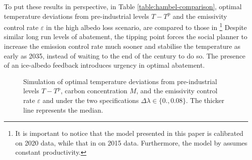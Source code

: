 \documentclass[../../main.tex]{subfiles}
\begin{document}
To put these results in perspective, in Table \ref{table:hambel-comparison}, optimal temperature deviations from pre-industrial levels $T - T^{\mathrm{p}}$ and the emissivity control rate $\varepsilon$ in the high albedo loss scenario, are compared to those in \footnote{It is important to notice that the model presented in this paper is calibrated on 2020 data, while that in  on 2015 data. Furthermore, the model by  assumes constant productivity.} Despite similar long run levels of abatement, the tipping point forces the social planner to increase the emission control rate much sooner and stabilise the temperature as early as 2035, instead of waiting to the end of the century to do so. The presence of an ice-albedo feedback introduces urgency in optimal abatement.


\begin{figure}
    \centering
    \caption{Simulation of optimal temperature deviations from pre-industrial levels $T - T^{\mathrm{p}}$, carbon concentration $M$, and the emissivity control rate $\varepsilon$ and under the two specifications $\Delta\lambda \in \{0., 0.08\}$. The thicker line represents the median.}
    \label{fig:simfig}
\end{figure}
\end{document}
